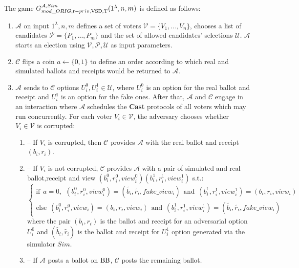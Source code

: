 \begin{definition}
The game $G_{mod\_ORIG,t-priv, \operatorname{VSD},\operatorname{T}}^{\mathcal{A},Sim}(1^{\lambda},n,m)$ is defined as follows:
\begin{enumerate} 
\item $\mathcal{A}$ on input $1^{\lambda},n,m$ defines a set of voters  $\mathcal{V} = \{V_1,...,V_n\}$, chooses a list of candidates  $\mathcal{P} = \{P_1,...,P_m\}$ and the set of allowed candidates' selections $\mathcal{U}$.  $\mathcal{A}$ starts an election using $\mathcal{V}, \mathcal{P}, \mathcal{U}$ as input parameters.
\item $\mathcal{C}$ flips a coin $a \leftarrow \{0,1\}$ to define an order according to which real and simulated ballots and receipts would be returned to $\mathcal{A}$.
\item   $\mathcal{A}$ sends to  $\mathcal{C}$ options $U_i^0, U_i^1 \in  \mathcal{U}$, where $U_i^0$ is an option for the real ballot and receipt and $U_i^1$ is an option for the fake ones.  After that, $\mathcal{A}$ and $\mathcal{C}$ engage in an interaction where $\mathcal{A}$ schedules the \textbf{Cast}   protocols of all voters which may run concurrently. For each voter $V_i \in \mathcal{V}$, the adversary chooses whether $V_i \in \mathcal{V}$ is corrupted: 
\begin{enumerate}
\item[] -- If $V_i$ is corrupted, then $\mathcal{C}$ provides $\mathcal{A}$ with the real ballot and receipt $(b_i,r_i)$.
\item[] --  If $V_i$ is not corrupted, $\mathcal{C}$  provides $\mathcal{A}$ with a pair of simulated and real ballot,receipt and view $(b_i^0, r_i^0,view_i^0) (b_i^1, r_i^1,view_i^1)$ s.t.:\\
$ \begin{cases}
 \text{if} ~~a =0,~~ (b_i^0,r_i^0,view_i^0) = (\tilde{b_i},\tilde{r_i},fake\_view_i) ~~ \text{and} ~~  (b_i^1,r_i^1,view_i^1) = (b_i,r_i,view_i)   \\ 
 \text{else}~~ (b_i^0,r_i^0,view_i) =(b_i,r_i,view_i)~~  \text{and} ~~  (b_i^1,r_i^1,view_i^1) =(\tilde{b_i},\tilde{r_i},fake\_view_i)
\end{cases}$\\ 
where the pair $(b_i, r_i)$ is the ballot and receipt for an adversarial option $U_i^0$ and $(\tilde{b_i},\tilde{r_i})$ is the ballot and receipt for  $U_i^1$ option generated via the simulator $Sim$.
\item[] --  If  $\mathcal{A}$ posts a ballot on $\operatorname{BB}$, $\mathcal{C}$ posts the remaining ballot. 

\end{enumerate}
\end{enumerate}
\end{definition}
